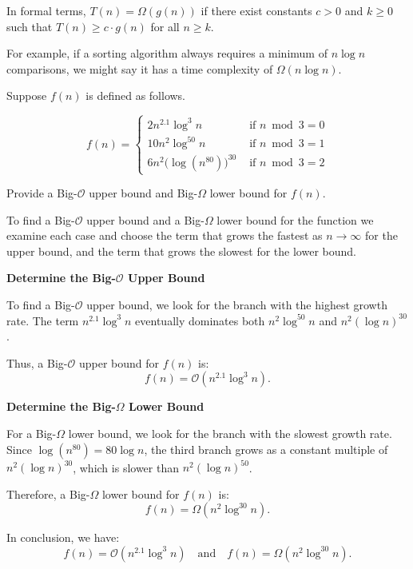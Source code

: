 In formal terms, $T(n) = \Omega(g(n))$ if there exist constants $c > 0$ and $k \geq 0$ such that $T(n) \geq c \cdot g(n)$ for all $n \geq k$.

For example, if a sorting algorithm always requires a minimum of $n \log n$ comparisons, we might say it has a time complexity of $\Omega(n \log n)$.

\begin{example}

    Suppose $f(n)$ is defined as follows.
    
    \[
    f(n)= \begin{cases}2 n^{2.1} \log ^3 n & \text { if } n \bmod 3=0 \\ 10 n^2 \log ^{50} n & \text { if } n \bmod 3=1 \\ 6 n^2 \bigl(\log(n^{80})\bigr)^{30} & \text { if } n \bmod 3=2\end{cases}
    \]
    
    
    Provide a Big-$\mathcal{O}$ upper bound and Big-$\Omega$ lower bound for $f(n)$.
    \end{example}
    
    \begin{solution}
        To find a Big-$\mathcal{O}$ upper bound and a Big-$\Omega$ lower bound for the function we examine each case and choose the term that grows the fastest as \( n \to \infty \) for the upper bound, and the term that grows the slowest for the lower bound.
        
        \textbf{Determine the Big-$\mathcal{O}$ Upper Bound}
        
        To find a Big-$\mathcal{O}$ upper bound, we look for the branch with the highest growth rate. The term \(n^{2.1}\log^3 n\) eventually dominates both \(n^2\log^{50}n\) and \(n^2(\log n)^{30}\).
        
        Thus, a Big-$\mathcal{O}$ upper bound for \( f(n) \) is:
        \[
        f(n) = \mathcal{O}(n^{2.1} \log^3 n).
        \]
        
        \textbf{Determine the Big-$\Omega$ Lower Bound}
        
        For a Big-$\Omega$ lower bound, we look for the branch with the slowest growth rate. Since $\log(n^{80})=80\log n$, the third branch grows as a constant multiple of \(n^2(\log n)^{30}\), which is slower than \(n^2(\log n)^{50}\).
        
        Therefore, a Big-$\Omega$ lower bound for \( f(n) \) is:
        \[
        f(n) = \Omega(n^2 \log^{30} n).
        \]
        
        In conclusion, we have:
        \[
        f(n) = \mathcal{O}(n^{2.1} \log^3 n) \quad \text{and} \quad f(n) = \Omega(n^2 \log^{30} n).
        \]\end{solution}

